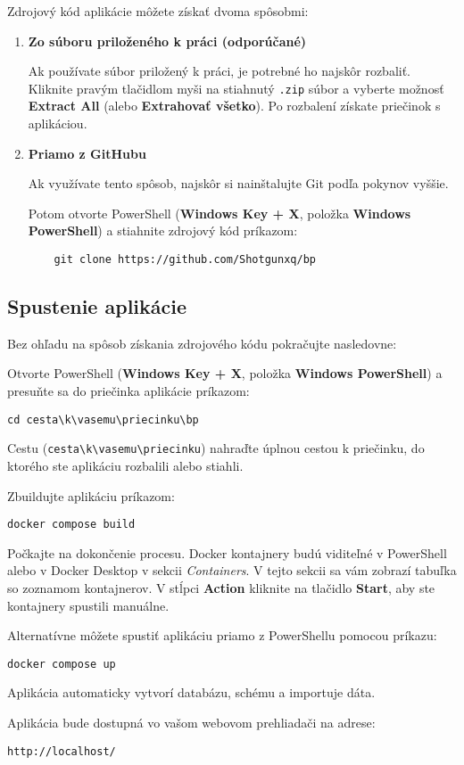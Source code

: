 Zdrojový kód aplikácie môžete získať dvoma spôsobmi:

\begin{enumerate}
    \item \textbf{Zo súboru priloženého k práci (odporúčané)}

    Ak používate súbor priložený k práci, je potrebné ho najskôr rozbaliť. Kliknite pravým tlačidlom myši na stiahnutý \texttt{.zip} súbor a vyberte možnosť \textbf{Extract All} (alebo \textbf{Extrahovať všetko}). Po rozbalení získate priečinok s aplikáciou.

    \item \textbf{Priamo z GitHubu}

    Ak využívate tento spôsob, najskôr si nainštalujte Git podľa pokynov vyššie.

    Potom otvorte PowerShell (\textbf{Windows Key + X}, položka \textbf{Windows PowerShell}) a stiahnite zdrojový kód príkazom:

    \begin{verbatim}
    git clone https://github.com/Shotgunxq/bp
    \end{verbatim}
\end{enumerate}

\subsection*{Spustenie aplikácie}

Bez ohľadu na spôsob získania zdrojového kódu pokračujte nasledovne:

Otvorte PowerShell (\textbf{Windows Key + X}, položka \textbf{Windows PowerShell}) a presuňte sa do priečinka aplikácie príkazom:

\begin{verbatim}
cd cesta\k\vasemu\priecinku\bp
\end{verbatim}

Cestu (\texttt{cesta\textbackslash k\textbackslash vasemu\textbackslash priecinku}) nahraďte úplnou cestou k priečinku, do ktorého ste aplikáciu rozbalili alebo stiahli.

Zbuildujte aplikáciu príkazom:

\begin{verbatim}
docker compose build
\end{verbatim}

Počkajte na dokončenie procesu. Docker kontajnery budú viditeľné v PowerShell alebo v Docker Desktop v sekcii \textit{Containers}. V tejto sekcii sa vám zobrazí tabuľka so zoznamom kontajnerov. V stĺpci \textbf{Action} kliknite na tlačidlo \textbf{Start}, aby ste kontajnery spustili manuálne.

Alternatívne môžete spustiť aplikáciu priamo z PowerShellu pomocou príkazu:

\begin{verbatim}
docker compose up
\end{verbatim}

Aplikácia automaticky vytvorí databázu, schému a importuje dáta.

Aplikácia bude dostupná vo vašom webovom prehliadači na adrese:

\begin{verbatim}
http://localhost/
\end{verbatim}